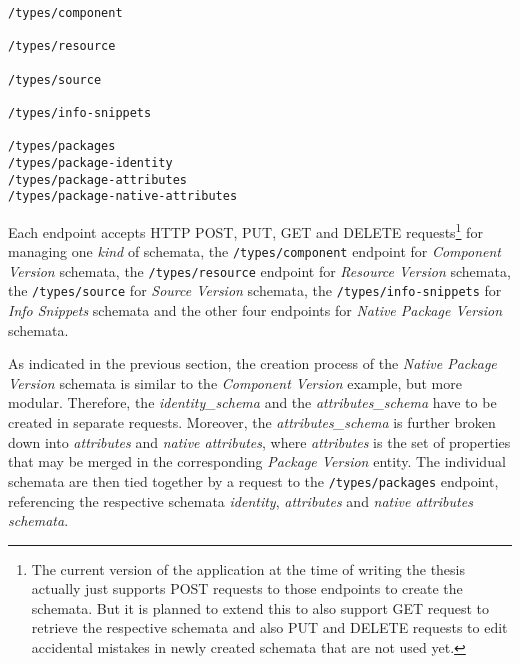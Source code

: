 \begin{lstlisting}[basicstyle=\tiny, caption=Types API Endpoints, captionpos=b, label=lst:TypesEndpoints]
/types/component

/types/resource

/types/source

/types/info-snippets

/types/packages
/types/package-identity
/types/package-attributes
/types/package-native-attributes
\end{lstlisting}

Each endpoint accepts HTTP POST, PUT, GET and DELETE requests\footnote{The current version of the application at the time of writing the thesis actually just supports POST requests to those endpoints to create the schemata. But it is planned to extend this to also support GET request to retrieve the respective schemata and also PUT and DELETE requests to edit accidental mistakes in newly created schemata that are not used yet.} for managing one \emph{kind} of schemata, the \lstinline|/types/component| endpoint for \emph{Component Version} schemata, the \lstinline|/types/resource| endpoint for \emph{Resource Version} schemata, the \lstinline|/types/source| for \emph{Source Version} schemata, the \lstinline|/types/info-snippets| for \emph{Info Snippets} schemata and the other four endpoints for \emph{Native Package Version} schemata.\par
As indicated in the previous section, the creation process of the \emph{Native Package Version} schemata is similar to the \emph{Component Version} example, but more modular. Therefore, the \emph{identity\_schema} and the \emph{attributes\_schema} have to be created in separate requests. Moreover, the \emph{attributes\_schema} is further broken down into \emph{attributes} and \emph{native attributes}, where \emph{attributes} is the set of properties that may be merged in the corresponding \emph{Package Version} entity. The individual schemata are then tied together by a request to the \lstinline|/types/packages| endpoint, referencing the respective schemata \emph{identity}, \emph{attributes} and \emph{native attributes schemata}.\\

